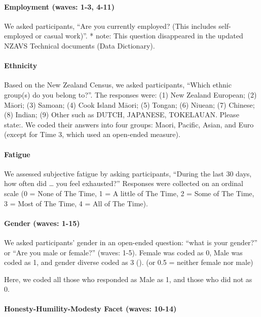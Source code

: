 \documentclass[
  single column]{article}
\let\oldparagraph\paragraph
\renewcommand{\paragraph}[1]{\oldparagraph{#1}\mbox{}}
\begin{document}
\paragraph{Employment (waves: 1-3,
4-11)}\label{employment-waves-1-3-4-11}

We asked participants, ``Are you currently employed? (This includes
self-employed or casual work)''. * note: This question disappeared in
the updated NZAVS Technical documents (Data Dictionary).

\paragraph{Ethnicity}\label{ethnicity}

Based on the New Zealand Census, we asked participants, ``Which ethnic
group(s) do you belong to?''. The responses were: (1) New Zealand
European; (2) Māori; (3) Samoan; (4) Cook Island Māori; (5) Tongan; (6)
Niuean; (7) Chinese; (8) Indian; (9) Other such as DUTCH, JAPANESE,
TOKELAUAN. Please state:. We coded their answers into four groups:
Maori, Pacific, Asian, and Euro (except for Time 3, which used an
open-ended measure).

\paragraph{Fatigue}\label{fatigue}

We assessed subjective fatigue by asking participants, ``During the last
30 days, how often did \ldots{} you feel exhausted?'' Responses were
collected on an ordinal scale (0 = None of The Time, 1 = A little of The
Time, 2 = Some of The Time, 3 = Most of The Time, 4 = All of The Time).

\paragraph{Gender (waves: 1-15)}\label{gender-waves-1-15}

We asked participants' gender in an open-ended question: ``what is your
gender?'' or ``Are you male or female?'' (waves: 1-5). Female was coded
as 0, Male was coded as 1, and gender diverse coded as 3
(). (or 0.5
= neither female nor male)

Here, we coded all those who responded as Male as 1, and those who did
not as 0.

\paragraph{Honesty-Humility-Modesty Facet (waves:
10-14)}\label{honesty-humility-modesty-facet-waves-10-14}
\end{document}

